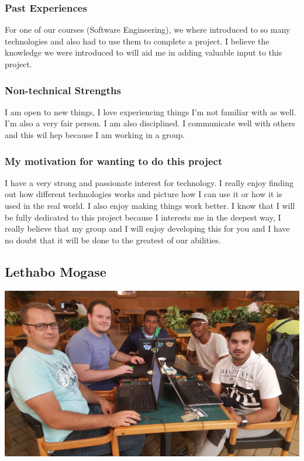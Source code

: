 \documentclass[a4paper,12pt]{article}
\begin{document}
			\subsubsection{Past Experiences}
			For one of our courses (Software Engineering), we where introduced to so many technologies and also had to use them to complete a project. I believe the knowledge we were introduced to will aid me in adding valuable input to this project.
			
			\subsubsection{Non-technical Strengths}
			I am open to new things, I love experiencing things I'm not familiar with as well. I'm also a very fair person. I am also disciplined. I communicate well with others and this wil hep because I am working in a group.
			\subsubsection{My motivation for wanting to do this project}
			I have a very strong and passionate interest for technology. I really enjoy finding out how different technologies works and picture how I can use it or  how it is used in the real world. I also enjoy making things work better. I know that I will be fully dedicated to this project because I interests me in the deepest way, I really believe that my group and I will enjoy developing this for you and I have no doubt that it will be done to the greatest of our abilities.  
		
		\newpage
		\subsection{Lethabo Mogase}
		\includegraphics[width=1\textwidth]{./Pictures/the_group.jpg}\\
\end{document}
